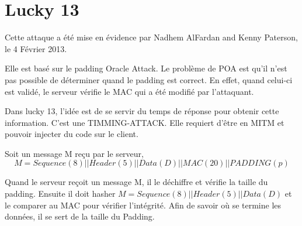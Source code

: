 \chapter{Lucky 13}
\label{chapter:luck}

Cette attaque a été mise en évidence par Nadhem AlFardan and Kenny Paterson, le 4 Février 2013.

Elle est basé sur le padding Oracle Attack. Le problème de POA est qu'il n'est pas possible de déterminer
quand le padding est correct. En effet, quand celui-ci est validé, le serveur vérifie le MAC qui a été modifié par
l'attaquant. 

Dans lucky 13, l'idée est de se servir du temps de réponse pour obtenir cette information. C'est une TIMMING-ATTACK.
Elle requiert d'être en MITM et pouvoir injecter du code sur le client.

Soit un message M reçu par le serveur, \[ M = Sequence (8) || Header (5) || Data (D) || MAC (20) || PADDING (p) \]

Quand le serveur reçoit un message M, il le déchiffre et vérifie la taille du padding. 
Ensuite il doit hasher  $M = Sequence (8) || Header (5) || Data (D)$  et le comparer au MAC 
pour vérifier l'intégrité. Afin de savoir où se termine les données, il se sert de la taille du Padding.


